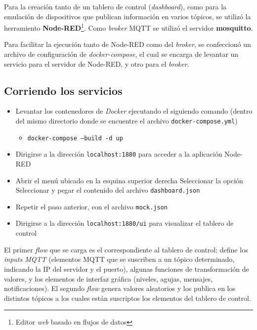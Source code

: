 Para la creación tanto de un tablero de control (\emph{dashboard}), como para la emulación de dispositivos que publican información en varios tópicos, se utilizó la herramiento \textbf{Node-RED}\footnote{Editor \emph{web} basado en flujos de datos\autocite{NodeRED}}. Como \emph{broker} MQTT se utilizó el servidor \textbf{mosquitto}.

Para facilitar la ejecución tanto de Node-RED como del \emph{broker}, se confeccionó un archivo de configuración de \emph{docker-compose}, el cual se encarga de levantar un servicio para el servidor de Node-RED, y otro para el \emph{broker}.   

\subsection{Corriendo los servicios}

\begin{itemize}
    \item Levantar los contenedores de \emph{Docker} ejecutando el siguiendo comando (dentro del mismo directorio donde se encuentre el archivo \texttt{docker-compose.yml})
    \begin{itemize}
        \item \texttt{docker-compose --build -d up} 
    \end{itemize}
    \item Dirigirse a la dirección \texttt{localhost:1880} para acceder a la aplicación Node-RED
    \item Abrir el menú ubicado en la esquina superior derecha \textrightarrow Seleccionar la opción  \textrightarrow Seleccionar  y pegar el contenido del archivo \texttt{dashboard.json} 
    \item Repetir el paso anterior, con el archivo \texttt{mock.json} 
    \item Dirigirse a la dirección \texttt{localhost:1880/ui} para visualizar el tablero de control 
\end{itemize}

El primer \emph{flow} que se carga es el correspondiente al tablero de control; define los \emph{inputs MQTT} (elementos MQTT que se suscriben a un tópico determinado, indicando la IP del servidor y el puerto), algunas funciones de transformación de valores, y los elementos de interfaz gráfica (niveles, agujas, mensajes, notificaciones). El segundo \emph{flow} genera valores aleatorios y los publica en los distintos tópicos a los cuales están suscriptos los elementos del tablero de control.  



\clearpage
\printbibliography


